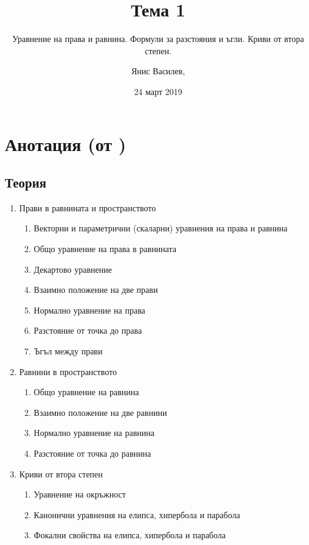 \documentclass[numbers=endperiod]{scrartcl}
\title{Тема 1}
\subtitle{Уравнение на права и равнина. Формули за разстояния и ъгли. Криви от втора степен.}
\author{Янис Василев, \Email{ianis@ivasilev.net}}
\date{24 март 2019}
\begin{document}
\maketitle

\section{Анотация (от \cite{Syllabus})}

\subsection{Теория}

\begin{enumerate}
    \item Прави в равнината и пространството
    \begin{enumerate}
        \item Векторни и параметрични (скаларни) уравнения на права и равнина
        \item Общо уравнение на права в равнината
        \item Декартово уравнение
        \item Взаимно положение на две прави
        \item Нормално уравнение на права
        \item Разстояние от точка до права
        \item Ъгъл между прави
    \end{enumerate}

    \item Равнини в пространството
    \begin{enumerate}
        \item Общо уравнение на равнина
        \item Взаимно положение на две равнини
        \item Нормално уравнение на равнина
        \item Разстояние от точка до равнина
    \end{enumerate}

    \item Криви от втора степен
    \begin{enumerate}
        \item Уравнение на окръжност
        \item Канонични уравнения на елипса, хипербола и парабола
        \item Фокални свойства на елипса, хипербола и парабола
    \end{enumerate}
\end{enumerate}
\end{document}
